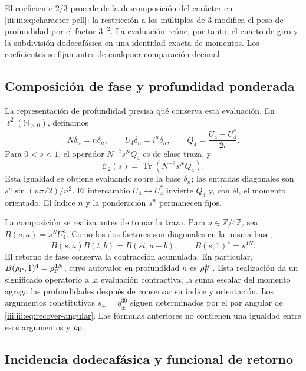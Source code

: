 El coeficiente $2/3$ procede de la descomposición del carácter en
\eqref{iii:iii:eq:character-pell}: la restricción a los múltiplos de $3$
modifica el peso de profundidad por el factor $3^{-2}$. La evaluación
reúne, por tanto, el cuarto de giro y la subdivisión dodecafásica en una
identidad exacta de momentos. Los coeficientes se fijan antes de cualquier
comparación decimal.

\subsection{Composición de fase y profundidad ponderada}

La representación de profundidad precisa qué conserva esta evaluación.
En $\ell^2(\mathbb N_{>0})$, definamos
\[
 N\delta_n=n\delta_n,\qquad U_4\delta_n=i^n\delta_n,
 \qquad Q_4=\frac{U_4-U_4^*}{2i}.
\]
Para $0<s<1$, el operador $N^{-2}s^NQ_4$ es de clase traza, y
\begin{equation}
 \mathcal C_2(s)=\operatorname{Tr}(N^{-2}s^NQ_4).
 \label{iii:iii:eq:pell-depth-trace}
\end{equation}
Esta igualdad se obtiene evaluando sobre la base $\delta_n$; las
entradas diagonales son $s^n\sin(n\pi/2)/n^2$. El intercambio
$U_4\leftrightarrow U_4^*$ invierte $Q_4$ y, con él, el momento
orientado. El índice $n$ y la ponderación $s^n$ permanecen fijos.

La composición se realiza antes de tomar la traza. Para
$a\in\mathbb Z/4\mathbb Z$, sea $B(s,a)=s^NU_4^a$. Como los dos
factores son diagonales en la misma base,
\begin{equation}
 B(s,a)B(t,b)=B(st,a+b),\qquad
 B(s,1)^4=s^{4N}.
 \label{iii:iii:eq:pell-depth-composition}
\end{equation}
El retorno de fase conserva la contracción acumulada. En particular,
$B(\rho_{\rm P},1)^4=\rho_{\rm P}^{4N}$, cuyo autovalor en profundidad
$n$ es $\rho_{\rm P}^{4n}$. Esta realización da un significado
operatorio a la evaluación contractiva; la suma escalar del momento
agrega las profundidades después de conservar su índice y orientación.
Los argumentos constitutivos $s_\pm=q_\pm^{30}$ siguen determinados por
el par angular de \eqref{iii:iii:eq:recover-angular}. Las fórmulas anteriores
no contienen una igualdad entre esos argumentos y $\rho_{\rm P}$.

\subsection{Incidencia dodecafásica y funcional de retorno}

